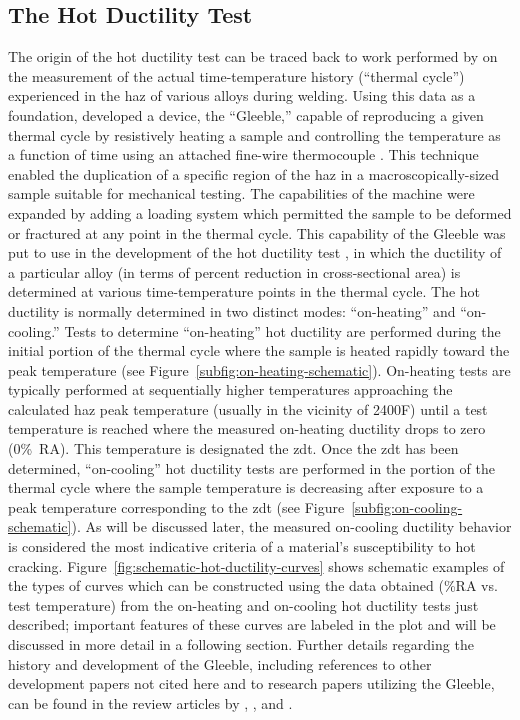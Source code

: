 \subsection{The Hot Ductility Test}
The origin of the hot ductility test can be traced back to work performed by \citet{nippes_cooling_1949} on the measurement of the actual time-temperature history (“thermal cycle”) experienced in the \gls{haz} of various alloys during welding.  Using this data as a foundation, \citeauthor{nippes_development_1949} developed a device, the “Gleeble,” capable of reproducing a given thermal cycle by resistively heating a sample and controlling the temperature as a function of time using an attached fine-wire thermocouple \cite{nippes_development_1949}. This technique enabled the duplication of a specific region of the \gls{haz} in a macroscopically-sized sample suitable for mechanical testing.  The capabilities of the machine were expanded by adding a loading system which permitted the sample to be deformed or fractured at any point in the thermal cycle.  This capability of the Gleeble was put to use in the development of the hot ductility test \cite{nippes_investigation_1955}, in which the ductility of a particular alloy (in terms of percent reduction in cross-sectional area) is determined at various time-temperature points in the thermal cycle.  The hot ductility is normally determined in two distinct modes: “on-heating” and “on-cooling.”  Tests to determine “on-heating” hot ductility are performed during the initial portion of the thermal cycle where the sample is heated rapidly toward the peak temperature (see Figure~\ref{subfig:on-heating-schematic}).  On-heating tests are typically performed at sequentially higher temperatures approaching the calculated \gls{haz} peak temperature (usually in the vicinity of 2400\textdegree{}F) until a test temperature is reached where the measured on-heating ductility drops to zero (0\%~RA).  This temperature is designated the \gls{zdt}.  Once the \gls{zdt} has been determined, “on-cooling” hot ductility tests are performed in the portion of the thermal cycle where the sample temperature is decreasing after exposure to a peak temperature corresponding to the \gls{zdt} (see Figure~\ref{subfig:on-cooling-schematic}).  As will be discussed later, the measured on-cooling ductility behavior is considered the most indicative criteria of a material’s susceptibility to hot cracking.  Figure~\ref{fig:schematic-hot-ductility-curves} shows schematic examples of the types of curves which can be constructed using the data obtained (\%RA vs. test temperature) from the on-heating and on-cooling hot ductility tests just described; important features of these curves are labeled in the plot and will be discussed in more detail in a following section. Further details regarding the history and development of the Gleeble, including references to other development papers not cited here and to research papers utilizing the Gleeble, can be found in the review articles by \citet{savage_apparatus_1962}, \citet{lundin_historical_1997}, and \citet{lundin_standardization_1990_history}. 

